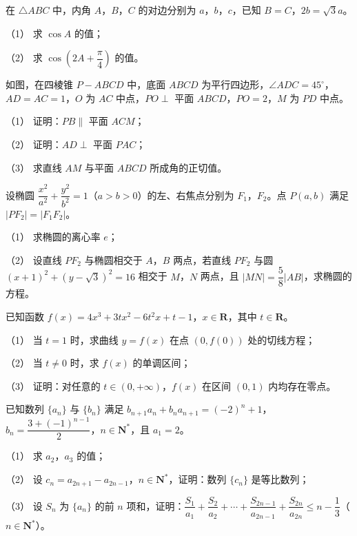 \begin{question}
在 $\triangle ABC$ 中，内角 $A$，$B$，$C$ 的对边分别为 $a$，$b$，$c$，已知 $B=C$，$2b=\sqrt3a$。

（1） 求 $\cos A$ 的值；

（2） 求 $\cos\left(2A+\dfrac\pi4\right)$ 的值。

\Needspace{0.4\textheight}
\end{question}
\begin{question}
如图，在四棱锥 $P-ABCD$ 中，底面 $ABCD$ 为平行四边形，$\angle ADC=45^\circ$，$AD=AC=1$，$O$ 为 $AC$ 中点，$PO\perp$ 平面 $ABCD$，$PO=2$，$M$ 为 $PD$ 中点。

（1） 证明：$PB\parallel$ 平面 $ACM$；

（2） 证明：$AD\perp$ 平面 $PAC$；

（3） 求直线 $AM$ 与平面 $ABCD$ 所成角的正切值。
\nopagebreak[4]
\begin{center}\end{center}
\nopagebreak[4]
\end{question}
\begin{question}
设椭圆 $\dfrac{x^2}{a^2}+\dfrac{y^2}{b^2}=1$（$a>b>0$）的左、右焦点分别为 $F_1$，$F_2$。点 $P(a,b)$ 满足 $|PF_2|=|F_1F_2|$。

（1） 求椭圆的离心率 $e$；

（2） 设直线 $PF_2$ 与椭圆相交于 $A$，$B$ 两点，若直线 $PF_2$ 与圆 $(x+1)^2+(y-\sqrt3)^2=16$ 相交于 $M$，$N$ 两点，且 $|MN|=\dfrac58|AB|$，求椭圆的方程。

\end{question}
\begin{question}
已知函数 $f(x)=4x^3+3tx^2-6t^2x+t-1$，$x\in\mathbf R$，其中 $t\in\mathbf R$。

（1） 当 $t=1$ 时，求曲线 $y=f(x)$ 在点 $(0,f(0))$ 处的切线方程；

（2） 当 $t\neq0$ 时，求 $f(x)$ 的单调区间；

（3） 证明：对任意的 $t\in(0,+\infty)$，$f(x)$ 在区间 $(0,1)$ 内均存在零点。

\end{question}
\begin{question}
已知数列 $\{a_n\}$ 与 $\{b_n\}$ 满足 $b_{n+1}a_n+b_na_{n+1}=(-2)^n+1$，$b_n=\dfrac{3+(-1)^{n-1}}2$，$n\in\mathbf N^*$，且 $a_1=2$。

（1） 求 $a_2$，$a_3$ 的值；

（2） 设 $c_n=a_{2n+1}-a_{2n-1}$，$n\in\mathbf N^*$，证明：数列 $\{c_n\}$ 是等比数列；

（3） 设 $S_n$ 为 $\{a_n\}$ 的前 $n$ 项和，证明：$\dfrac{S_1}{a_1}+\dfrac{S_2}{a_2}+\cdots+\dfrac{S_{2n-1}}{a_{2n-1}}+\dfrac{S_{2n}}{a_{2n}}\leqslant n-\dfrac13$（$n\in\mathbf N^*$）。

\clearpage

\end{question}